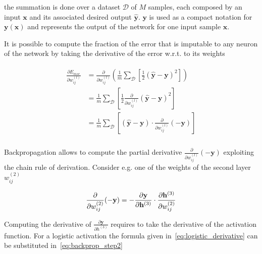 \noindent the summation is done over a dataset $\mathcal{D}$ of $M$ samples,
each composed by an input $\mathbf{x}$ and its associated desired output
$\mathbf{\hat y}$. $\mathbf{y}$ is used as a compact notation for
$\mathbf{y(x)}$ and represents the output of the network for one input sample
$\mathbf{x}$.

It is possible to compute the fraction of the error that is imputable to any
neuron of the network
by taking the derivative of the error w.r.t. to its weights

\begin{align}\label{eq:backprop_step1}
\begin{split}
    \frac{\partial E_{mse}}{\partial w_{ij}^{(l)}} &=
    \frac{\partial}{\partial w_{ij}^{(l)}}\left(
        \frac{1}{m}\sum_{\mathcal{D}}\left[
        \frac{1}{2}(\mathbf{\hat y} - \mathbf{y})^2\right]\right) \\
    &= \frac{1}{m}\sum_{\mathcal{D}} \left[\frac{1}{2}
        \frac{\partial}{\partial w_{ij}^{(l)}}
        \left(\mathbf{\hat y} - \mathbf{y}\right)^2\right] \\
    &= \frac{1}{m}\sum_{\mathcal{D}}\left[(\mathbf{\hat y} - \mathbf{y})
        \cdot \frac{\partial}{\partial w_{ij}^{(l)}}(-\mathbf{y})\right] \\
\end{split}
\end{align}

\noindent Backpropagation allows to compute the partial derivative
$\frac{\partial}{\partial w_{ij}^{(l)}}(-\mathbf{y})$
exploiting the chain rule of derivation. Consider e.g. one of the weights of
the second layer $w_{ij}^{(2)}$

\begin{equation}\label{eq:backprop_step2}
    \frac{\partial }{\partial w_{ij}^{(2)}}(-\mathbf{y}) =
        -\frac{\partial \mathbf{y}}{\partial \mathbf{h}^{(3)}} \cdot
        \frac{\partial \mathbf{h}^{(3)}}{\partial w_{ij}^{(2)}} \\
\end{equation}

\noindent Computing the derivative of $\frac{\partial \mathbf{y}}{\partial
h^{(3)}}$ requires to take the derivative of the activation function. For a
logistic activation the formula given in~\autoref{eq:logistic_derivative} can
be substituted in~\autoref{eq:backprop_step2}

